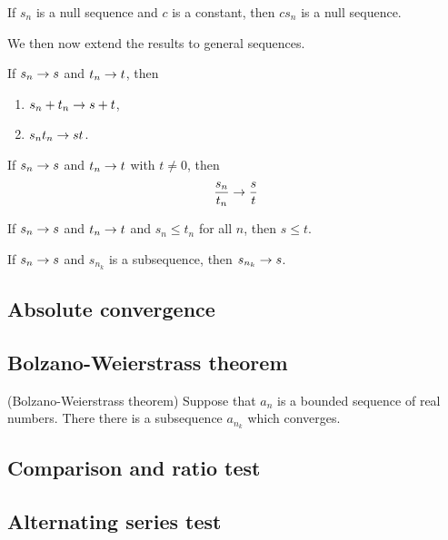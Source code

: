 \documentclass[main.tex]{subfiles}
\begin{document}
	\begin{corollary}
		If $s_n$ is a null sequence and $c$ is a constant, then $cs_n$ is a null sequence.
	\end{corollary}
	We then now extend the results to general sequences.
	\begin{theorem}
		If $s_n \rightarrow s$ and $t_n \rightarrow t$, then
		\begin{enumerate}
			\item $s_n + t_n \rightarrow s + t$,
			\item $s_n t_n \rightarrow st$.
		\end{enumerate}
	\end{theorem}
	
	\begin{theorem}
		If $s_n \rightarrow s$ and $t_n \rightarrow t$ with $t \neq 0$, then
		\begin{equation*}
		\frac{s_n}{t_n} \rightarrow \frac{s}{t}
		\end{equation*}
	\end{theorem}
	
	\begin{theorem}
		If $s_n \rightarrow s$ and $t_n \rightarrow t$ and $s_n \leq t_n$ for all $n$, then $s \leq t$.
	\end{theorem}
	
	\begin{theorem}
		If $s_n \rightarrow s$ and $s_{n_k}$ is a subsequence, then $s_{n_k} \rightarrow s$.
	\end{theorem}
	
	\subsection{Absolute convergence}
	
	\subsection{Bolzano-Weierstrass theorem}
	\begin{theorem}(Bolzano-Weierstrass theorem)
		Suppose that $a_n$ is a bounded sequence of real numbers. There there is a subsequence $a_{n_k}$ which converges.
	\end{theorem}
	\subsection{Comparison and ratio test}
	
	\subsection{Alternating series test}
	
\end{document}
